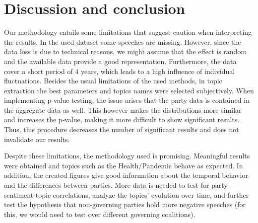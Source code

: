 \documentclass{article}
\begin{document}
\section{Discussion and conclusion}

Our methodology entails some limitations that suggest caution when interpreting the results. 
In the used dataset some speeches are missing.
However, since the data loss is due to technical reasons, we might assume that the effect is random and the available data provide a good representation.
Furthermore, the data cover a short period of 4 years, which leads to a high influence of individual fluctuations.
Besides the usual limitations of the used methods, in topic extraction the best parameters and topics names were selected subjectively.
When implementing p-value testing, the issue arises that the party data is contained in the aggregate data as well.
This however makes the distributions more similar and increases the p-value, making it more difficult to show significant results.
Thus, this procedure decreases the number of significant results and does not invalidate our results.

Despite these limitations, the methodology used is promising.
Meaningful results were obtained and topics such as the Health/Pandemic behave as expected. 
In addition, the created figures give good information about the temporal behavior and the differences between parties.
More data is needed to test for party-sentiment-topic correlations, analyze the topics' evolution over time, and further test the hypothesis that non-governing parties hold more negative speeches (for this, we would need to test over different governing coalitions).

\end{document}
